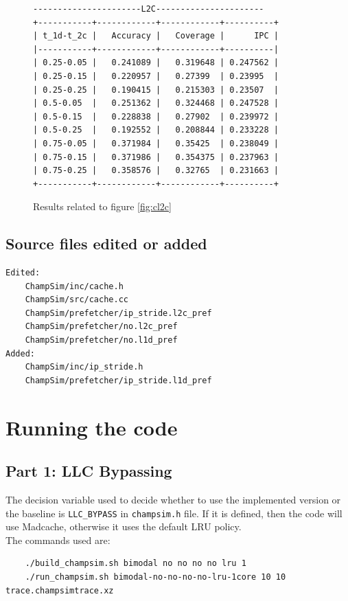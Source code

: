 \documentclass[11pt, swedish, openany]{book}
\begin{document}
\begin{figure}[H]
    \centering
    \begin{BVerbatim}
----------------------L2C----------------------
+-----------+------------+------------+----------+
| t_1d-t_2c |   Accuracy |   Coverage |      IPC |
|-----------+------------+------------+----------|
| 0.25-0.05 |   0.241089 |   0.319648 | 0.247562 |
| 0.25-0.15 |   0.220957 |   0.27399  | 0.23995  |
| 0.25-0.25 |   0.190415 |   0.215303 | 0.23507  |
| 0.5-0.05  |   0.251362 |   0.324468 | 0.247528 |
| 0.5-0.15  |   0.228838 |   0.27902  | 0.239972 |
| 0.5-0.25  |   0.192552 |   0.208844 | 0.233228 |
| 0.75-0.05 |   0.371984 |   0.35425  | 0.238049 |
| 0.75-0.15 |   0.371986 |   0.354375 | 0.237963 |
| 0.75-0.25 |   0.358576 |   0.32765  | 0.231663 |
+-----------+------------+------------+----------+
    \end{BVerbatim}
    \caption{Results related to figure \ref{fig:cl2c}}
\end{figure}

\section{Source files edited or added}
\vspace{-0.8em}
\begin{verbatim}
Edited:
    ChampSim/inc/cache.h
    ChampSim/src/cache.cc
    ChampSim/prefetcher/ip_stride.l2c_pref
    ChampSim/prefetcher/no.l2c_pref
    ChampSim/prefetcher/no.l1d_pref
Added:
    ChampSim/inc/ip_stride.h
    ChampSim/prefetcher/ip_stride.l1d_pref
\end{verbatim}

\chapter{Running the code}
\section{Part 1: LLC Bypassing}
The decision variable used to decide whether to use the implemented version or the baseline is \texttt{LLC\_BYPASS} in \texttt{champsim.h} file. If it is defined, then the code will use Madcache, otherwise it uses the default LRU policy.\\
The commands used are:
\begin{verbatim}
    ./build_champsim.sh bimodal no no no no lru 1
    ./run_champsim.sh bimodal-no-no-no-no-lru-1core 10 10 trace.champsimtrace.xz
\end{verbatim}
\end{document}
